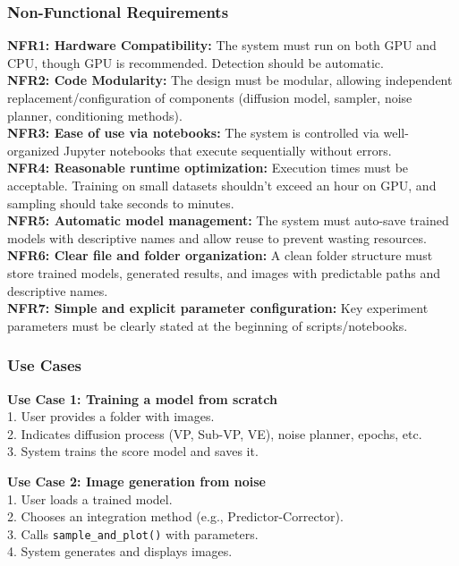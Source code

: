 \documentclass[11pt,a4paper]{article}
\begin{document}
\subsubsection*{Non-Functional Requirements}
\textbf{NFR1: Hardware Compatibility:} The system must run on both GPU and CPU, though GPU is recommended. Detection should be automatic. \\
\textbf{NFR2: Code Modularity:} The design must be modular, allowing independent replacement/configuration of components (diffusion model, sampler, noise planner, conditioning methods). \\
\textbf{NFR3: Ease of use via notebooks:} The system is controlled via well-organized Jupyter notebooks that execute sequentially without errors. \\
\textbf{NFR4: Reasonable runtime optimization:} Execution times must be acceptable. Training on small datasets shouldn't exceed an hour on GPU, and sampling should take seconds to minutes. \\
\textbf{NFR5: Automatic model management:} The system must auto-save trained models with descriptive names and allow reuse to prevent wasting resources. \\
\textbf{NFR6: Clear file and folder organization:} A clean folder structure must store trained models, generated results, and images with predictable paths and descriptive names. \\
\textbf{NFR7: Simple and explicit parameter configuration:} Key experiment parameters must be clearly stated at the beginning of scripts/notebooks.

\subsubsection*{Use Cases}
\textbf{Use Case 1: Training a model from scratch}\\
1. User provides a folder with images.\\
2. Indicates diffusion process (VP, Sub-VP, VE), noise planner, epochs, etc.\\
3. System trains the score model and saves it.

\textbf{Use Case 2: Image generation from noise}\\
1. User loads a trained model.\\
2. Chooses an integration method (e.g., Predictor-Corrector).\\
3. Calls \texttt{sample\_and\_plot()} with parameters. \\
4. System generates and displays images.
\end{document}
